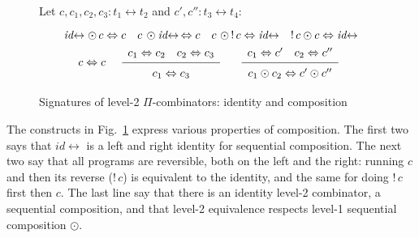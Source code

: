 \documentclass{article}
\newcommand{\dist}{\mathit{dist}}
\newcommand{\idc}{\mathit{id}\!\!\leftrightarrow}
\newcommand{\Rule}[4]{
\makebox{{\rm #1}
$\displaystyle
\frac{\begin{array}{l}#2 \\\end{array}}
{\begin{array}{l}#3      \\\end{array}}$
 #4}}
\begin{document}

\begin{figure}[tb]
Let $c, c_1, c_2, c_3 : t_1 \leftrightarrow t_2$ and $c', c'' : t_3 \leftrightarrow t_4$:
\[\def\arraystretch{1.3}
\begin{array}{c}
  {\idc \odot \, c \Leftrightarrow c}
\quad
  {c \, \odot \idc \, \Leftrightarrow c}
\quad
  {c\,\, \odot\,!\, c \Leftrightarrow \idc}
\quad
  {!\, c \odot c \Leftrightarrow \idc}
\\
  {c \Leftrightarrow c}
\quad
\Rule{}
  {c_1 \Leftrightarrow c_2 \quad c_2 \Leftrightarrow c_3}
  {c_1 \Leftrightarrow c_3}
  {}
\quad
\Rule{}
  {c_1 \Leftrightarrow c' \quad c_2 \Leftrightarrow c''}
  {c_1 \odot c_2 \Leftrightarrow c' \odot c''}
  {}
\end{array}\]
\caption{\label{figh}Signatures of level-2 $\Pi$-combinators: identity and composition}
\end{figure}

The constructs in Fig.~\ref{figh} express various properties of composition.
The first two says that $\idc$ is a left and right identity for sequential composition.
The next two say that all programs are reversible, both on the left and the right:
running $c$ and then its reverse ($!\, c$) is equivalent to the identity, and the
same for doing $!\, c$ first then $c$. The last line say that there is an
identity level-2 combinator, a sequential composition, and that level-2
equivalence respects level-1 sequential composition $\odot$.
\end{document}
